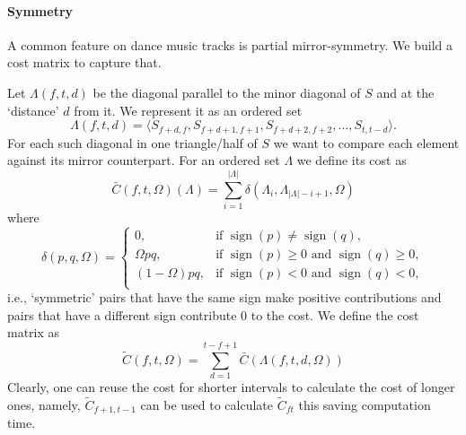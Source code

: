 \documentclass[twocolumn]{article}
\newcommand{\sign}{\mathop{\mathrm{sign}}}
\begin{document}
	
	\paragraph{Symmetry}	


	
A common feature on dance music tracks is partial mirror-symmetry. We build a cost matrix to capture that.
	
Let $\Lambda(f,t,d)$ be the diagonal parallel to the minor diagonal
of $S$ and at the `distance' $d$ from it. We represent it as an ordered set
\begin{dmath*}
\Lambda(f,t,d)
 = \langle S_{f+d,f}, S_{f+d+1, f+1}, S_{f+d+2, f+2},\ldots, S_{t, t-d}\rangle.
	\end{dmath*} 
For each such diagonal in one triangle/half of $S$ we want to compare
each element against its mirror counterpart. For an ordered set
$\Lambda$ we define its cost as
\begin{dmath*}
\bar C(f,t,\Omega)(\Lambda)=\sum_{i=1}^{|\Lambda|}\delta(\Lambda_i,\Lambda_{|\Lambda|-i+1},\Omega)
\end{dmath*}
where
\begin{dmath*}
\delta(p,q,\Omega) = 
\left\{\begin{array}{ll}
0,  & \text{if~}\sign( p ) \ne \sign( q ),\\
\Omega pq,   & \text{if~}  \sign(p) \ge 0 \text{~and~} \sign(q) \ge 0 ,  \\
(1-\Omega)pq,  & \text{if~} \sign(p) < 0 \text{~and~} \sign(q) < 0, \\
\end{array}\right.
\end{dmath*}
i.e., `symmetric' pairs that have the same sign make positive
contributions and pairs that have a different sign contribute $0$ to
the cost. We define the cost matrix as
\begin{dmath*}
\tilde C(f,t,\Omega) = \sum_{d=1}^{t-f+1}\bar C(\Lambda(f,t,d,\Omega))
\end{dmath*}
Clearly, one can reuse the cost for shorter intervals to calculate the
cost of longer ones, namely, $\tilde C_{f+1,t-1}$ can be used to
calculate $\tilde C_{ft}$ this saving computation time.

	
	
\end{document}
